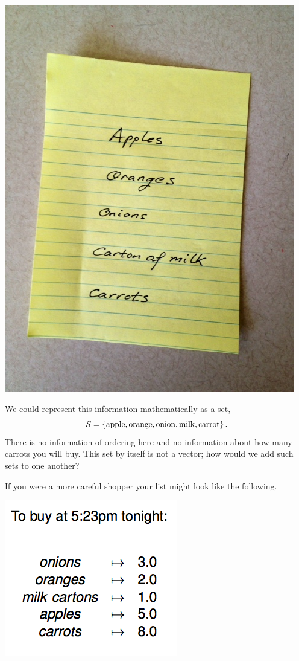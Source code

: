\begin{center}
\includegraphics[scale =.3]{list.jpg}
\end{center}

\noindent
We could represent this information mathematically as a set, \[S=\{\rm apple, orange, onion, milk, carrot\}\, .\] There is no information
of ordering here and no information about how many carrots you will buy. This set by itself is not a vector; how would we add such sets to 
one another?

If you were a more careful shopper your list might look like the following.

\begin{center}
\includegraphics[scale =.5]{shoplist}
\end{center}

